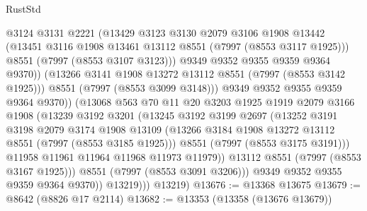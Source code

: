 \begin{lexlean}{RustStd}
\begin{coremodule}
                            @3124
                            @3131
                            @2221
                            (@13429
                              @3123
                              @3130
                              @2079
                              @3106
                              @1908
                              @13442
                              (@13451 @3116 @1908 @13461 @13112 @8551 (@7997 (@8553 @3117 @1925)))
                              @8551
                              (@7997 (@8553 @3107 @3123)))
                            @9349
                            @9352
                            @9355
                            @9359
                            @9364
                            @9370))
                        (@13266 @3141 @1908 @13272 @13112 @8551 (@7997 (@8553 @3142 @1925)))
                        @8551
                        (@7997 (@8553 @3099 @3148)))
                      @9349
                      @9352
                      @9355
                      @9359
                      @9364
                      @9370))
                  (@13068
                    @563
                    @70
                    @11
                    @20
                    @3203
                    @1925
                    @1919
                    @2079
                    @3166
                    @1908
                    (@13239
                      @3192
                      @3201
                      (@13245
                        @3192
                        @3199
                        @2697
                        (@13252
                          @3191
                          @3198
                          @2079
                          @3174
                          @1908
                          @13109
                          (@13266 @3184 @1908 @13272 @13112 @8551 (@7997 (@8553 @3185 @1925)))
                          @8551
                          (@7997 (@8553 @3175 @3191)))
                        @11958
                        @11961
                        @11964
                        @11968
                        @11973
                        @11979))
                    @13112
                    @8551
                    (@7997 (@8553 @3167 @1925)))
                  @8551
                  (@7997 (@8553 @3091 @3206)))
                @9349
                @9352
                @9355
                @9359
                @9364
                @9370))
            @13219)))
      @13219)
@13676 := @13368 @13675
@13679 := @8642 (@8826 @17 @2114)
@13682 := @13353 (@13358 (@13676 @13679))

\end{coremodule}
\end{lexlean}
